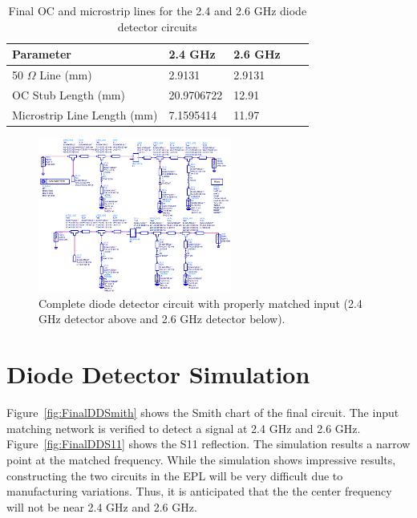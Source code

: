 \documentclass[conference]{IEEEtran}
\begin{document}
\begin{table}
   \caption{Final OC and microstrip lines for the 2.4 and 2.6 GHz diode detector circuits}
    \begin{tabular}{|l|l|l|l|l}
   \hline
    Parameter                          & 2.4 GHz    & 2.6 GHz  \\ \hline
    50 $\Omega$ Line (mm)       & 2.9131     & 2.9131   \\ \hline
    OC Stub Length (mm)         & 20.9706722 &    12.91 \\ \hline
    Microstrip Line Length (mm) & 7.1595414  & 11.97    \\ \hline
    \end{tabular}
\label{tab:diodetable}
\end{table}

\begin{figure}[!htb]
\centering
\includegraphics[width=2.5in]{diode-pics/diodedetectorsfinalchematic.png}
\caption{Complete diode detector circuit with properly matched input (2.4 GHz detector above and 2.6 GHz detector below).}
\label{fig:FinalDDSchematic}
\end{figure}

\section{Diode Detector Simulation}
Figure~\ref{fig:FinalDDSmith} shows the Smith chart of the final circuit.  The input matching network is verified to detect a signal at 2.4 GHz and 2.6 GHz.  Figure~\ref{fig:FinalDDS11} shows the S11 reflection.  The simulation results a narrow point at the matched frequency.  While the simulation shows impressive results, constructing the two circuits in the EPL will be very difficult due to manufacturing variations.  Thus, it is anticipated that the the center frequency will not be near 2.4 GHz and 2.6 GHz.
\end{document}
